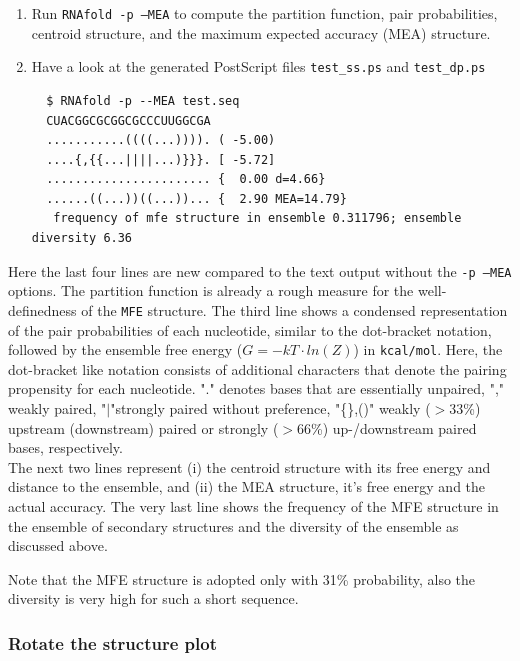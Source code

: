 \documentclass[a4paper]{article}
\begin{document}
\begin{enumerate}
\item Run \texttt{RNAfold -p --MEA} to compute the partition function,
pair probabilities, centroid structure, and the maximum expected accuracy
(MEA) structure.
\item Have a look at the generated PostScript files \texttt{test\_ss.ps} and
\texttt{test\_dp.ps}
\begin{verbatim}
  $ RNAfold -p --MEA test.seq 
  CUACGGCGCGGCGCCCUUGGCGA
  ...........((((...)))). ( -5.00)
  ....{,{{...||||...)}}}. [ -5.72]
  ....................... {  0.00 d=4.66}
  ......((...))((...))... {  2.90 MEA=14.79}
   frequency of mfe structure in ensemble 0.311796; ensemble diversity 6.36  

\end{verbatim}
  \end{enumerate}
\noindent
Here the last four lines are new compared to the text output without the \texttt{-p --MEA} 
options. The partition function is already a rough measure for the well-definedness of the \texttt{MFE}
structure. The third line shows a condensed representation of the pair probabilities of each 
nucleotide, similar to the dot-bracket notation, followed by the ensemble free energy
($G = -kT \cdot ln(Z)$) in \texttt{kcal/mol}. Here, the dot-bracket like notation consists
of additional characters that denote the pairing propensity for each nucleotide. 
"." denotes bases that are essentially unpaired, "," weakly paired, 
"$|$"strongly paired without preference, "\{\},()" weakly ($>$33\%) upstream (downstream) 
paired or strongly ($>$66\%) up-/downstream paired bases, respectively.\\

The next two lines represent (i) the centroid structure
with its free energy and distance to the ensemble, and (ii) the MEA structure, it's free
energy and the actual accuracy. The very last line shows the frequency of the MFE structure in 
the ensemble of secondary structures and the diversity of the ensemble as discussed above.

Note that the MFE structure is adopted only with 31\% probability, also the
diversity is very high for such a short sequence.\\

\subsubsection{Rotate the structure plot}
\end{document}
